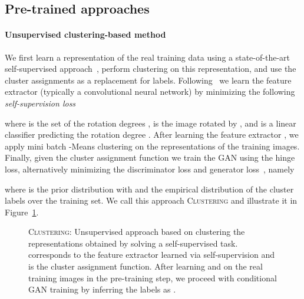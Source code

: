 \documentclass{article}
\newcommand{\tranC}{\textsc{Clustering}}
\begin{document}
\subsection{Pre-trained approaches} \label{sec:transfermethods}
\paragraph{Unsupervised clustering-based method}
We first learn a representation of the real training data using a state-of-the-art self-supervised approach~\citep{gidaris2018unsupervised, kolesnikov2019revisiting}, perform clustering on this representation, and use the cluster assignments as a replacement for labels. Following~\citet{gidaris2018unsupervised} we learn the feature extractor  (typically a convolutional neural network) by minimizing the following \emph{self-supervision loss}

where  is the set of the  rotation degrees ,  is the image  rotated by , and  is a linear classifier predicting the rotation degree . After learning the feature extractor , we apply mini batch -Means clustering \citep{sculley2010web} on the representations of the training images. Finally, given the cluster assignment function  we train the GAN using the hinge loss, alternatively minimizing the discriminator loss  and generator loss~, namely

where  is the prior distribution with  and  the empirical distribution of the cluster labels  over the training set. 
We call this approach \tranC{} and illustrate it in Figure~\ref{fig:unsupervised_illustration}.

\begin{figure}[t]
\centering
{}
\caption{\tranC{}: Unsupervised approach based on clustering the representations obtained by solving a self-supervised task.  corresponds to the feature extractor learned via self-supervision and  is the cluster assignment function. After learning  and  on the real training images in the pre-training step, we proceed with conditional GAN training by inferring the labels as . \label{fig:unsupervised_illustration}}
\end{figure}
\end{document}
